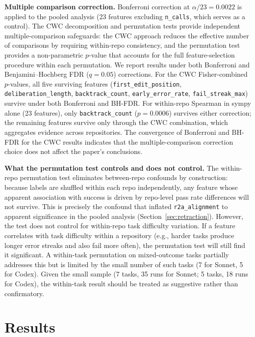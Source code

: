 \documentclass[11pt]{article}
\newcommand{\feat}[1]{\texttt{#1}}
\newcommand{\rtalign}{\feat{r2a\_alignment}}
\begin{document}
\textbf{Multiple comparison correction.}
Bonferroni correction at $\alpha/23 = 0.0022$ is applied to the pooled analysis (23 features excluding \feat{n\_calls}, which serves as a control).
The CWC decomposition and permutation tests provide independent multiple-comparison safeguards: the CWC approach reduces the effective number of comparisons by requiring within-repo consistency, and the permutation test provides a non-parametric $p$-value that accounts for the full feature-selection procedure within each permutation.
We report results under both Bonferroni and Benjamini--Hochberg FDR ($q = 0.05$) corrections.
For the CWC Fisher-combined $p$-values, all five surviving features (\feat{first\_edit\_position}, \feat{deliberation\_length}, \feat{backtrack\_count}, \feat{early\_error\_rate}, \feat{fail\_streak\_max}) survive under both Bonferroni and BH-FDR.
For within-repo Spearman in sympy alone (23 features), only \feat{backtrack\_count} ($p = 0.0006$) survives either correction; the remaining features survive only through the CWC combination, which aggregates evidence across repositories.
The convergence of Bonferroni and BH-FDR for the CWC results indicates that the multiple-comparison correction choice does not affect the paper's conclusions.

\textbf{What the permutation test controls and does not control.}
The within-repo permutation test eliminates between-repo confounds by construction: because labels are shuffled within each repo independently, any feature whose apparent association with success is driven by repo-level pass rate differences will not survive.
This is precisely the confound that inflated \rtalign{} to apparent significance in the pooled analysis (Section~\ref{sec:retraction}).
However, the test does not control for within-repo task difficulty variation.
If a feature correlates with task difficulty within a repository (e.g., harder tasks produce longer error streaks and also fail more often), the permutation test will still find it significant.
A within-task permutation on mixed-outcome tasks partially addresses this but is limited by the small number of such tasks (7 for Sonnet, 5 for Codex).
Given the small sample (7 tasks, 35 runs for Sonnet; 5 tasks, 18 runs for Codex), the within-task result should be treated as suggestive rather than confirmatory.


\section{Results}
\label{sec:results}
\end{document}
